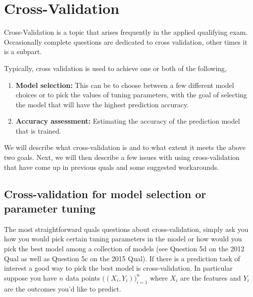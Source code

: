 \section{Cross-Validation}

Cross-Validation is a topic that arises frequently in the applied qualifying exam. Occasionally complete questions are dedicated to cross validation, other times it is a subpart.

Typically, cross validation is used to achieve one or both of the following,
\begin{enumerate}
\item \textbf{Model selection:} This can be to choose between a few different model choices or to pick the values of tuning parameters, with the goal of selecting the model that will have the highest prediction accuracy.
\item \textbf{Accuracy assessment:} Estimating the accuracy of the prediction model that is trained.
\end{enumerate}

We will describe what cross-validation is and to what extent it meets the above two goals. Next, we will then describe a few issues with using cross-validation that have come up in previous quals and some suggested workarounds.

\subsection{Cross-validation for model selection or parameter tuning}\label{sec:CVmodelSelection}

The most straightforward quals questions about cross-validation, simply ask you how you would pick certain tuning parameters in the model or how would you pick the best model among a collection of models (see Question 5d on the 2012 Qual as well as Question 5c on the 2015 Qual). If there is a prediction task of interest a good way to pick the best model is cross-validation. In particular suppose you have $n$ data points $\big( (X_i,Y_i )  \big)_{i=1}^n$ where $X_i$ are the features and $Y_i$ are the outcomes you'd like to predict.

